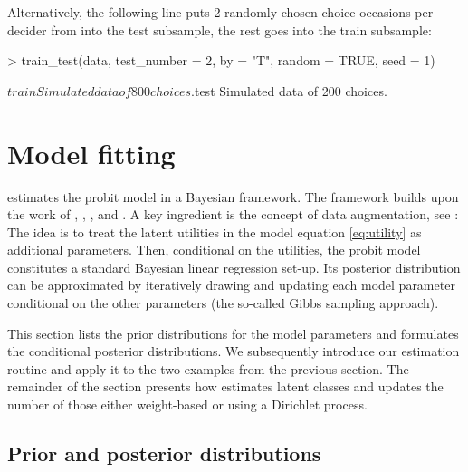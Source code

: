 \documentclass[article]{jss}
\newcommand{\fct}[1]{\code{#1()}}
\begin{document}
Alternatively, the following line puts 2 randomly chosen choice occasions per decider from  into the test subsample, the rest goes into the train subsample:

\begin{Schunk}
\begin{Sinput}
> train_test(data, test_number = 2, by = "T", random = TRUE, seed = 1)
\end{Sinput}
\begin{Soutput}
$train
Simulated data of 800 choices.

$test
Simulated data of 200 choices.
\end{Soutput}
\end{Schunk}



\section{Model fitting} \label{sec:model_fitting}

 estimates the probit model in a Bayesian framework. The framework builds upon the work of \cite{McCulloch:1994}, \cite{Nobile:1998}, \cite{Allenby:1998}, and \cite{Imai:2005}. A key ingredient is the concept of data augmentation, see \cite{Albert:1993}: The idea is to treat the latent utilities in the model equation \eqref{eq:utility} as additional parameters. Then, conditional on the utilities, the probit model constitutes a standard Bayesian linear regression set-up. Its posterior distribution can be approximated by iteratively drawing and updating each model parameter conditional on the other parameters (the so-called Gibbs sampling approach).

This section lists the prior distributions for the model parameters and formulates the conditional posterior distributions. We subsequently introduce our estimation routine \fct{fit\_model} and apply it to the two examples from the previous section. The remainder of the section presents how  estimates latent classes and updates the number of those either weight-based or using a Dirichlet process.

\subsection{Prior and posterior distributions} \label{subsec:prior_and_posterior}
\end{document}
